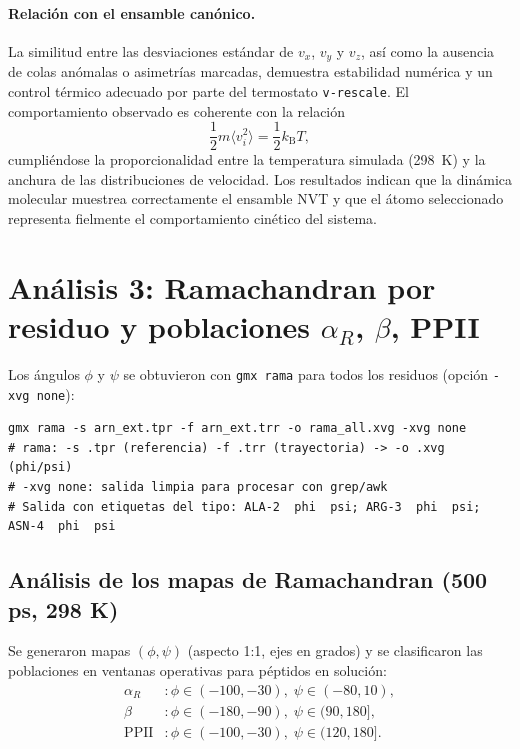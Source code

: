\documentclass[12pt,a4paper]{article}
\begin{document}
\paragraph{Relación con el ensamble canónico.}
La similitud entre las desviaciones estándar de $v_x$, $v_y$ y $v_z$, así como la ausencia de colas anómalas o asimetrías marcadas, demuestra estabilidad numérica y un control térmico adecuado por parte del termostato \texttt{v-rescale}. El comportamiento observado es coherente con la relación
\[
\frac{1}{2} m \langle v_i^2 \rangle = \frac{1}{2} k_{\mathrm{B}} T,
\]
cumpliéndose la proporcionalidad entre la temperatura simulada (298~K) y la anchura de las distribuciones de velocidad. Los resultados indican que la dinámica molecular muestrea correctamente el ensamble NVT y que el átomo seleccionado representa fielmente el comportamiento cinético del sistema.
\section{Análisis 3: Ramachandran por residuo y poblaciones
\texorpdfstring{$\alpha_R$}{alphaR}, \texorpdfstring{$\beta$}{beta}, PPII}
Los ángulos \(\phi\) y \(\psi\) se obtuvieron con \texttt{gmx rama} para todos los residuos (opción \texttt{-xvg none}):

\begin{lstlisting}[style=bashstyle,texcl=false]
gmx rama -s arn_ext.tpr -f arn_ext.trr -o rama_all.xvg -xvg none
# rama: -s .tpr (referencia) -f .trr (trayectoria) -> -o .xvg (phi/psi)
# -xvg none: salida limpia para procesar con grep/awk
# Salida con etiquetas del tipo: ALA-2  phi  psi; ARG-3  phi  psi; ASN-4  phi  psi
\end{lstlisting}

\subsection*{Análisis de los mapas de Ramachandran (500 ps, 298 K)}

\noindent
Se generaron mapas \texorpdfstring{$(\phi,\psi)$}{(phi,psi)} (aspecto 1:1, ejes en grados) y se clasificaron las poblaciones en ventanas operativas para péptidos en solución:
\[
\begin{aligned}
\alpha_R &: \phi \in (-100,-30),\;\psi \in (-80,10),\\
\beta &: \phi \in (-180,-90),\;\psi \in (90,180],\\
\mathrm{PPII} &: \phi \in (-100,-30),\;\psi \in (120,180].
\end{aligned}
\]
\end{document}
